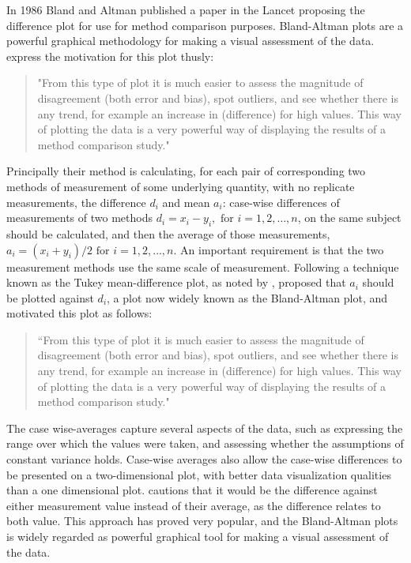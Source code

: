 \documentclass[12pt, a4paper]{report}
\theoremstyle{plain}
\theoremstyle{definition}
\theoremstyle{remark}
\begin{document}
	
In 1986 Bland and Altman published a paper in the Lancet proposing the difference plot for use for method comparison purposes. 	Bland-Altman plots are a powerful graphical methodology for making
a visual assessment of the data. \citet*{BA83} express the
motivation for this plot thusly:
\begin{quote}
	"From this type of plot it is much easier to assess the magnitude
	of disagreement (both error and bias), spot outliers, and see
	whether there is any trend, for example an increase in
	(difference) for high values. This way of plotting the data is a
	very powerful way of displaying the results of a method comparison
	study."
\end{quote}
 Principally their method is calculating, for each pair of corresponding two methods of measurement of some underlying quantity, with no replicate measurements, the difference $d_i$ and mean $a_i$: case-wise differences of measurements of two methods $d_{i} = x_{i}-y_{i}, \mbox{ for }i=1,2,\dots,n$, on the same subject
should be calculated, and then the average of those measurements, 
$a_{i} = (x_{i} + y_{i})/2 \mbox{ for }i=1,2,\dots, n$. An important requirement is that the two measurement methods use the same scale of measurement. Following a technique known as the Tukey mean-difference plot, as noted by \citet{kozak2014including}, \citet{BA83} proposed that $a_i$ should be plotted against $d_i$, a plot now widely known as the Bland-Altman plot, and motivated this plot as follows:
	\begin{quote}
		``From this type of plot it is much easier to assess the magnitude
		of disagreement (both error and bias), spot outliers, and see
		whether there is any trend, for example an increase in (difference) for high values. This way of plotting the data is a very powerful way of displaying the results of a method comparison study."
	\end{quote}
	
	The case wise-averages capture several aspects of the data, such as expressing the range over which the values were taken, and assessing whether the assumptions of constant variance holds. Case-wise averages also allow the case-wise differences to be presented on a two-dimensional plot, with better data visualization qualities than a one dimensional plot. \citet{BA86}
	cautions that it would be the difference against either measurement value instead of their average, as the difference relates to both value. This approach has proved very popular, and the Bland-Altman plots is widely regarded as powerful graphical tool for making a visual assessment of the data.
	
\end{document}
